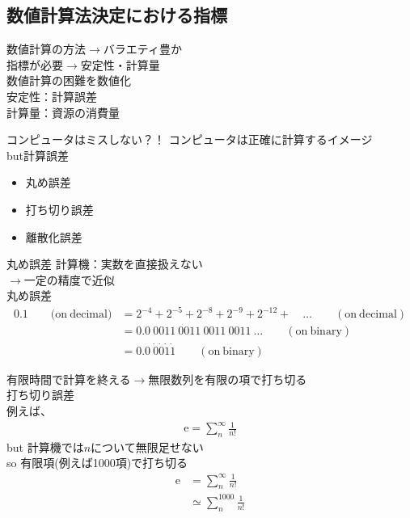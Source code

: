 \documentclass[unicode, 12pt, aspectratio=169]{beamer}
\begin{document}
\subsection{数値計算法決定における指標}
\frame{\insertsubsection}
\begin{frame}
    数値計算の方法$\rightarrow$バラエティ豊か\\
    \alert{指標が必要}$\rightarrow$安定性・計算量\\
    数値計算の困難を数値化\\
    安定性：計算誤差\\
    計算量：資源の消費量
\end{frame}

\begin{frame}{コンピュータはミスしない？！}
  コンピュータは正確に計算するイメージ\\
  \alert{but}計算誤差
  \begin{itemize}
    \item 丸め誤差
    \item 打ち切り誤差
    \item 離散化誤差
    \end{itemize}
\end{frame}

\begin{frame}{丸め誤差}
    計算機：実数を直接扱えない\\
    $\rightarrow$一定の精度で近似\\
    \alert{丸め誤差}\\
    \begin{align}
      0.1 \qquad \mathrm{(on \: decimal})
      &= 2^{-4} + 2^{-5} + 2^{-8} + 2^{-9} + 2^{-12} + \quad \dots \qquad\mathrm{(on \: decimal)} \nonumber\\
      &=0.0\: 0011 \: 0011 \: 0011 \: 0011 \: \dots \qquad \mathrm{(on \: binary)} \nonumber\\
      &=0.0\: \dot{0} \dot{0} \dot{1} \dot{1} \qquad \mathrm{(on \: binary)}\label{DtoD}
    \end{align}
\end{frame}

\begin{frame}
    有限時間で計算を終える$\rightarrow$無限数列を有限の項で打ち切る\\
    打ち切り誤差\\
    例えば、
    \begin{align}
      \mathrm{e} = \sum_{n}^{\infty} \frac{1}{n!} \label{Napier}
    \end{align}
    \alert{but}
    計算機では$n$について無限足せない\\
    \alert{so}
    有限項(例えば1000項)で打ち切る
    \begin{align}
      \mathrm{e} &= \sum_{n}^{\infty} \frac{1}{n!} \nonumber\\
      &\simeq \sum_{n}^{1000} \frac{1}{n!} \label{NapierLess}
    \end{align}
\end{frame}
\end{document}
